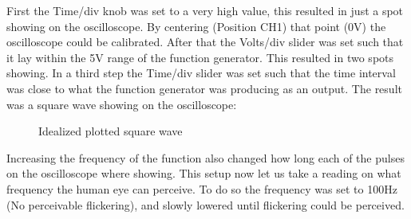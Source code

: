 \documentclass[fleqn,14pt]{article}
\begin{document}
First the Time/div knob was set to a very high value, this resulted in just a spot showing on the
oscilloscope. By centering (Position CH1) that point (0V) the oscilloscope could be calibrated. After that the
Volts/div slider was set such that it lay within the 5V range of the function generator. This resulted
in two spots showing. In a third step the Time/div slider was set such that the time interval was close
to what the function generator was producing as an output. The result was a square wave showing on the
oscilloscope:

\begin{figure}[H]
  \centering
  \caption{Idealized plotted square wave}
  \label{fig:figure2}
\end{figure}

Increasing the frequency of the function also changed how long each of the pulses on the oscilloscope where showing.
This setup now let us take a reading on what frequency the human eye can perceive. To do so the
frequency was set to 100Hz (No perceivable flickering), and slowly lowered until flickering could be perceived.
\end{document}
